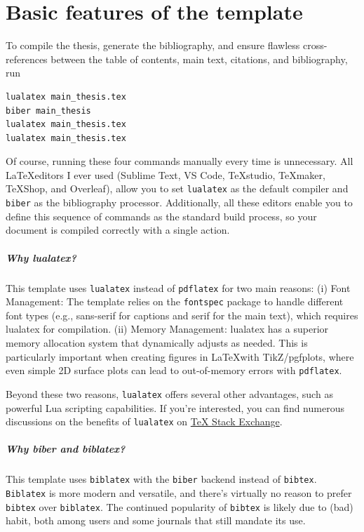 \graphicspath{{chapters/1_basicfeatures/figures/}}

\chapter{Basic features of the template}
To compile the thesis, generate the bibliography, and ensure flawless cross-references between the table of contents, main text, citations, and bibliography, run
\begin{lstlisting}
lualatex main_thesis.tex
biber main_thesis
lualatex main_thesis.tex
lualatex main_thesis.tex
\end{lstlisting}
Of course, running these four commands manually every time is unnecessary. All \LaTeX editors I ever used (Sublime Text, VS Code, TeXstudio, TeXmaker, TeXShop, and Overleaf), allow you to set \verb|lualatex| as the default compiler and \verb|biber| as the bibliography processor. Additionally, all these editors enable you to define this sequence of commands as the standard build process, so your document is compiled correctly with a single action.

\paragraph{Why lualatex?} 
This template uses \verb|lualatex| instead of \verb|pdflatex| for two main reasons:
(i) Font Management: The template relies on the \verb|fontspec| package to handle different font types (e.g., sans-serif for captions and serif for the main text), which requires lualatex for compilation.
(ii) Memory Management: lualatex has a superior memory allocation system that dynamically adjusts as needed. This is particularly important when creating figures in \LaTeX with TikZ/pgfplots, where even simple 2D surface plots can lead to out-of-memory errors with \verb|pdflatex|.

Beyond these two reasons, \verb|lualatex| offers several other advantages, such as powerful Lua scripting capabilities. If you're interested, you can find numerous discussions on the benefits of \verb|lualatex| on \href{tex.stackexchange.com}{TeX Stack Exchange}.

\paragraph{Why biber and biblatex?}

This template uses \verb|biblatex| with the \verb|biber| backend instead of \verb|bibtex|. \verb|Biblatex| is more modern and versatile, and there’s virtually no reason to prefer \verb|bibtex| over \verb|biblatex|. The continued popularity of \verb|bibtex| is likely due to (bad) habit, both among users and some journals that still mandate its use.

